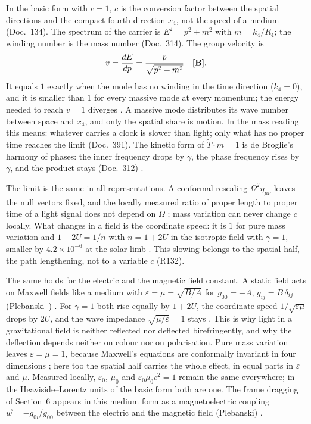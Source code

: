 In the basic form with $c=1$, $c$ is the conversion factor between the spatial directions and the
compact fourth direction $x_4$, not the speed of a medium (Doc.~134). The spectrum of the carrier is
$E^2=p^2+m^2$ with $m=k_4/R_4$; the winding number is the mass number (Doc.~314). The group velocity is
\begin{equation}
v=\frac{dE}{dp}=\frac{p}{\sqrt{p^2+m^2}}\quad\textbf{[B]}.
\end{equation}
It equals $1$ exactly when the mode has no winding in the time direction ($k_4=0$), and it is smaller
than $1$ for every massive mode at every momentum; the energy needed to reach $v=1$ diverges \BM. A
massive mode distributes its wave number between space and $x_4$, and only the spatial share is
motion. In the mass reading this means: whatever carries a clock is slower than light; only what has
no proper time reaches the limit (Doc.~391). The kinetic form of $\tilde T\cdot m=1$ is de Broglie's
harmony of phases: the inner frequency drops by $\gamma$, the phase frequency rises by $\gamma$, and the
product stays (Doc.~312) \BM.

The limit is the same in all representations. A conformal rescaling $\Omega^2\eta_{\mu\nu}$ leaves the
null vectors fixed, and the locally measured ratio of proper length to proper time of a light signal
does not depend on $\Omega$ \BM; mass variation can never change $c$ locally. What changes in a field
is the coordinate speed: it is $1$ for pure mass variation and $1-2U=1/n$ with $n=1+2U$ in the
isotropic field with $\gamma=1$, smaller by $4.2\times10^{-6}$ at the solar limb \KM. This slowing
belongs to the spatial half, the path lengthening, not to a variable $c$ (R132).

The same holds for the electric and the magnetic field constant. A static field acts on Maxwell fields
like a medium with $\varepsilon=\mu=\sqrt{B/A}$ for $g_{00}=-A$, $g_{ij}=B\,\delta_{ij}$
(Plebanski~\cite{Plebanski1960}) \QM. For $\gamma=1$ both rise equally by $1+2U$, the coordinate speed
$1/\sqrt{\varepsilon\mu}$ drops by $2U$, and the wave impedance $\sqrt{\mu/\varepsilon}=1$ stays \BM.
This is why light in a gravitational field is neither reflected nor deflected birefringently, and why
the deflection depends neither on colour nor on polarisation. Pure mass variation leaves
$\varepsilon=\mu=1$, because Maxwell's equations are conformally invariant in four dimensions \BM;
here too the spatial half carries the whole effect, in equal parts in $\varepsilon$ and $\mu$. Measured
locally, $\varepsilon_0$, $\mu_0$ and $\varepsilon_0\mu_0c^2=1$ remain the same everywhere; in the
Heaviside--Lorentz units of the basic form both are one. The frame dragging of Section~6 appears in
this medium form as a magnetoelectric coupling $\vec w=-g_{0i}/g_{00}$ between the electric and the
magnetic field (Plebanski) \QM.

